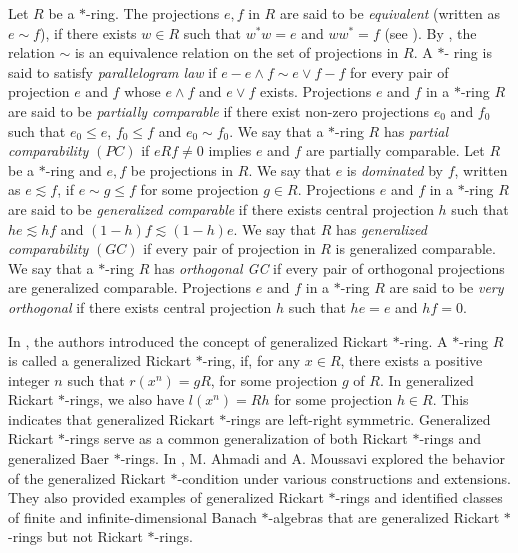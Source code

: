 \documentclass[11pt, one side,emlines]{amsart}
\theoremstyle{definition}
\numberwithin{equation}{section} \thispagestyle{empty} \voffset
\begin{document}
  Let $R$ be a $*$-ring. The projections $e, f$ in $R$ are said to be {\it equivalent}  (written as $e \sim f$),  if there exists $w\in R$
 such that $w^*w=e$ and $ww^*=f$ (see \cite {Ber}). By \cite[Proposition 7, page 5]{Ber},
 the relation $\sim$ is an equivalence relation on the set of projections in $R$.   A $*$- ring is said to satisfy {\it parallelogram law} if  $e-e\wedge f \sim  e\vee f-f$ for every pair of projection $e$ and $f$ whose $e\wedge f$ and $e\vee f$ exists. Projections $e$ and $f$ in a $*$-ring $R$ are said to be {\it partially comparable} if there exist non-zero projections $e_{0}$ and $f_{0}$ such that $e_{0} \le  e$,  $f_{0} \le f$ and $e_{0} \sim  f_{0}$.
 We say that a $*$-ring $R$ has  {\it partial comparability} $(PC)$ if $eRf \neq  0$ implies  $e$ and  $f$ are partially comparable.  Let $R$ be a $*$-ring and $e, f$ be projections in $R$. We say that $e$ is {\it dominated } by $f$,
 written as $e \lesssim f$, if $e \sim g \leq f$ for some projection $g \in R$. Projections $e$ and $f$ in a $*$-ring $R$ are said to be {\it generalized comparable} if there exists central projection $h$ such that $he \lesssim hf$ and $(1-h)f \lesssim (1-h)e$.
 We say that $R$ has {\it generalized comparability} $(GC)$ if every pair of projection in $R$ is generalized comparable. We say that a $*$-ring $R$ has { \it orthogonal GC} if every pair of orthogonal projections are generalized comparable. 
 Projections $e$ and $f$ in a $*$-ring $R$ are said to be {\it very orthogonal} if there exists central projection $h$ such that $he = e$ and $hf = 0$.
  
In \cite{cui2018pi}, the authors introduced the concept of generalized Rickart $*$-ring.  A $*$-ring $R$ is called a generalized Rickart $*$-ring, if, for any $x\in R$,
 there exists a positive integer $n$ such that $r(x^n)=gR$, for some projection $g$ of $R$.
 In generalized Rickart $*$-rings, we also have $l(x^n)=Rh$ for some projection $h\in R$. This indicates that generalized Rickart $*$-rings are left-right symmetric. Generalized Rickart $*$-rings serve as a common generalization of both Rickart $*$-rings and generalized Baer $*$-rings. In \cite{ahmadigen2021}, M. Ahmadi and A. Moussavi explored the behavior of the generalized Rickart $*$-condition under various constructions and extensions. They also provided  examples of
 generalized Rickart $*$-rings and identified classes of finite and infinite-dimensional Banach $*$-algebras that are generalized Rickart $*$-rings but not Rickart $*$-rings. 
 
\end{document}
